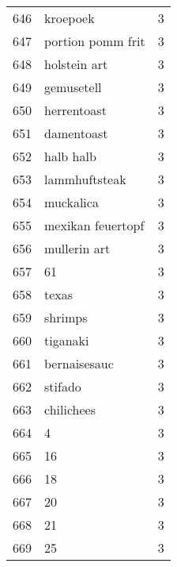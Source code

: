 \begin{tabular}{llr}
646  &                                           kroepoek &      3 \\
647  &                                  portion pomm frit &      3 \\
648  &                                       holstein art &      3 \\
649  &                                         gemusetell &      3 \\
650  &                                        herrentoast &      3 \\
651  &                                         damentoast &      3 \\
652  &                                          halb halb &      3 \\
653  &                                      lammhuftsteak &      3 \\
654  &                                          muckalica &      3 \\
655  &                                  mexikan feuertopf &      3 \\
656  &                                       mullerin art &      3 \\
657  &                                                 61 &      3 \\
658  &                                              texas &      3 \\
659  &                                            shrimps &      3 \\
660  &                                           tiganaki &      3 \\
661  &                                       bernaisesauc &      3 \\
662  &                                            stifado &      3 \\
663  &                                         chilichees &      3 \\
664  &                                                  4 &      3 \\
665  &                                                 16 &      3 \\
666  &                                                 18 &      3 \\
667  &                                                 20 &      3 \\
668  &                                                 21 &      3 \\
669  &                                                 25 &      3 \\

\end{tabular}
